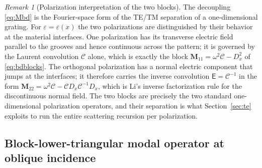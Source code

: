 \documentclass[11pt]{article}
\theoremstyle{remark}
\newtheorem{remark}[theorem]{Remark}
\newcommand{\eps}{\varepsilon}
\newcommand{\Cmat}{\mathcal{C}}
\newcommand{\epinv}{\mathsf{E}}
\begin{document}
\begin{remark}[Polarization interpretation of the two blocks]\label{rem:te-tm-blocks}
The decoupling \eqref{eq:Mbd} is the Fourier-space form of the TE/TM
separation of a one-dimensional grating.  For $\eps=\eps(x)$ the two
polarizations are distinguished by their behavior at the material interfaces.
One polarization has its transverse electric field parallel to the grooves and
hence continuous across the pattern; it is governed by the Laurent convolution
$\Cmat$ alone, which is exactly the block $\mathbf{M}_{11}=\omega^2\Cmat-D_x^2$
of \eqref{eq:bdblocks}.  The orthogonal polarization has a normal electric
component that jumps at the interfaces; it therefore carries the inverse
convolution $\epinv=\Cmat^{-1}$ in the form
$\mathbf{M}_{22}=\omega^2\Cmat-\Cmat D_x\Cmat^{-1}D_x$, which is Li's inverse
factorization rule \cite{li1996fourier} for the discontinuous normal field.
The two blocks are precisely the two standard one-dimensional polarization
operators, and their separation is what Section~\ref{sec:te} exploits to run
the entire scattering recursion per polarization.
\end{remark}

\subsection{Block-lower-triangular modal operator at oblique incidence}
\label{sec:blt}
\end{document}
